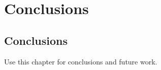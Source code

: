 \chapter{Conclusions}
\label{chap:conclusions}

\section{Conclusions}
\label{sec:conclusions}

Use this chapter for conclusions and future work.

